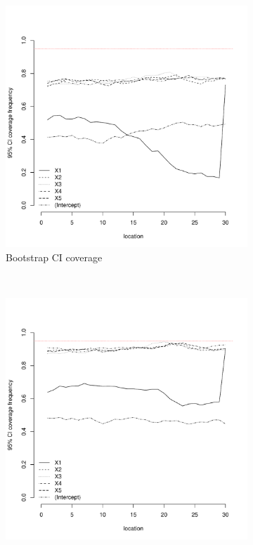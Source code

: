 \documentclass[authoryear, review, 11pt]{elsarticle}
\begin{document}
\begin{figure}
	\vspace{-30mm}
	\centering
	\begin{subfigure}[b]{0.45\textwidth}
	\centering
		\includegraphics[width=\textwidth]{../../figures/simulation/15.16.profile_bootstrap_coverage.pdf}
		\caption{Bootstrap CI coverage}
	\end{subfigure}%
	~ %
	\begin{subfigure}[b]{0.45\textwidth}
	\centering
		\includegraphics[width=\textwidth]{../../figures/simulation/15.16.profile_se_coverage.pdf}

\end{subfigure}
\end{figure}
\end{document}
